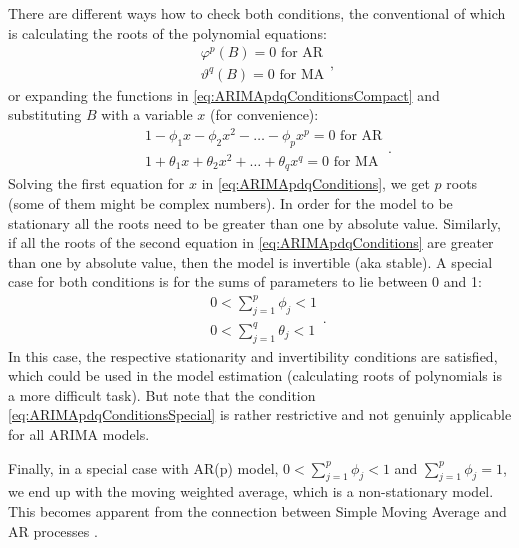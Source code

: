 \documentclass[
]{book}
\theoremstyle{definition}
\theoremstyle{definition}
\theoremstyle{definition}
\theoremstyle{definition}
\theoremstyle{remark}
\begin{document}
There are different ways how to check both conditions, the conventional of which is calculating the roots of the polynomial equations:
\begin{equation}
\begin{aligned}
  & \varphi^p(B) = 0 \text{ for AR} \\
  & \vartheta^q(B) = 0 \text{ for MA}
\end{aligned} ,
  \label{eq:ARIMApdqConditionsCompact}
\end{equation}
or expanding the functions in \eqref{eq:ARIMApdqConditionsCompact} and substituting \(B\) with a variable \(x\) (for convenience):
\begin{equation}
\begin{aligned}
  & 1 - \phi_1 x - \phi_2 x^2 - \dots - \phi_p x^p = 0 \text{ for AR} \\
  & 1 + \theta_1 x + \theta_2 x^2 + \dots + \theta_q x^q = 0 \text{ for MA}
\end{aligned} .
  \label{eq:ARIMApdqConditions}
\end{equation}
Solving the first equation for \(x\) in \eqref{eq:ARIMApdqConditions}, we get \(p\) roots (some of them might be complex numbers). In order for the model to be stationary all the roots need to be greater than one by absolute value. Similarly, if all the roots of the second equation in \eqref{eq:ARIMApdqConditions} are greater than one by absolute value, then the model is invertible (aka stable).
A special case for both conditions is for the sums of parameters to lie between 0 and 1:
\begin{equation}
\begin{aligned}
  & 0 < \sum_{j=1}^p \phi_j < 1 \\
  & 0 < \sum_{j=1}^q \theta_j < 1
\end{aligned} .
  \label{eq:ARIMApdqConditionsSpecial}
\end{equation}
In this case, the respective stationarity and invertibility conditions are satisfied, which could be used in the model estimation (calculating roots of polynomials is a more difficult task). But note that the condition \eqref{eq:ARIMApdqConditionsSpecial} is rather restrictive and not genuinly applicable for all ARIMA models.

Finally, in a special case with AR(p) model, \(0 < \sum_{j=1}^p \phi_j < 1\) and \(\sum_{j=1}^p \phi_j = 1\), we end up with the moving weighted average, which is a non-stationary model. This becomes apparent from the connection between Simple Moving Average and AR processes \citep{Svetunkov2017}.
\end{document}
